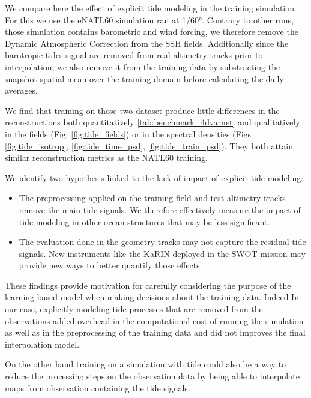 \documentclass[draft]{agujournal2019}
\begin{document}
We compare here the effect of explicit tide modeling in the training simulation. For this we use the eNATL60 simulation ran at 1/60°.  Contrary to other runs, those simulation contains barometric and wind forcing, we therefore remove the Dynamic Atmospheric Correction from the SSH fields. Additionally since the barotropic tides signal are removed from real altimetry tracks prior to interpolation, we also remove it from the training data by substracting the snapshot spatial mean over the training domain before calculating the daily averages.  

We find that training on those two dataset produce little differences in the reconstructions both quantitatively \ref{tab:benchmark_4dvarnet} and qualitatively in the fields (Fig. \ref{fig:tide_fields}) or in the spectral densities (Figs \ref{fig:tide_isotrop}, \ref{fig:tide_time_psd}, \ref{fig:tide_train_psd}). They both attain similar reconstruction metrics as the NATL60 training.
 
We identify two hypothesis linked to the lack of impact of explicit tide modeling:
\begin{itemize}
    \item The preprocessing applied on the training field and test altimetry tracks remove the main tide signals. We therefore effectively measure the impact of tide modeling in other ocean structures that may be less significant.
    \item The evaluation done in the geometry tracks may not capture the residual tide signals. New instruments like the KaRIN deployed in the SWOT mission may provide new ways to better quantify those effects.   
\end{itemize}

These findings provide motivation for carefully considering the purpose of the learning-based model when making decisions about the training data. Indeed In our case, explicitly modeling tide processes that are removed from the observations added overhead in the computational cost of running the simulation as well as in the preprocessing of the training data and did not improves the final interpolation model.

On the other hand training on a simulation with tide could also be a way to reduce the processing steps on the observation data by being able to interpolate maps from observation containing the tide signals.
\end{document}
